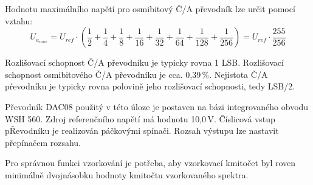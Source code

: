 \documentclass[a4paper, czech]{article}
\begin{document}
Hodnotu maximálního napětí pro osmibitový Č/A převodník lze určit pomocí vztahu:
\begin{equation*}
    U_{a_{max}} = U_{ref} \cdot \left(\frac{1}{2} + \frac{1}{4} + \frac{1}{8} + \frac{1}{16} + \frac{1}{32} + \frac{1}{64} + \frac{1}{128} + \frac{1}{256}\right) = U_{ref} \cdot \frac{255}{256}
\end{equation*}

Rozlišovací schopnost Č/A převodníku je typicky rovna 1 LSB.
Rozlišovací schopnost osmibitového Č/A převodníku je cca. 0,39\,\%.
Nejistota Č/A pŕevodníku je typicky rovna polovině jeho rozlišovací schopnosti, tedy LSB/2.

Převodník DAC08 použitý v této úloze je postaven na bázi integrovaného obvodu WSH 560.
Zdroj referenčního napětí má hodnotu 10,0\,V.
Číslicová vstup pŘevodníku je realizován páčkovými spínači.
Rozsah výstupu lze nastavit přepínačem rozsahu.

Pro správnou funkci vzorkování je potřeba, aby vzorkovací kmitočet byl roven minimálně dvojnásobku hodnoty kmitočtu vzorkovaného spektra.
\end{document}

